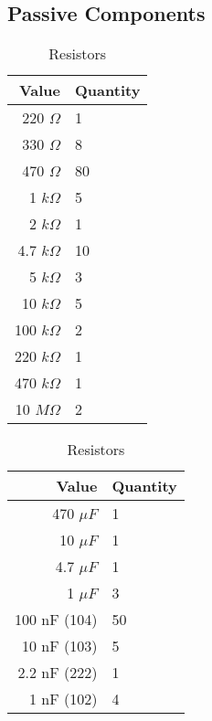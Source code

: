 \subsection{Passive Components}

\begin{table}[H]
  \centering
  \begin{subtable}[t]{0.3\textwidth}
    \vspace{0pt}
    \begin{tabular}{r|l}
      Value                    & Quantity \\ \hline
      220 $\Omega$              & 1  \\
      330 $\Omega$              & 8  \\
      470 $\Omega$              & 80 \\
      1 $k\Omega$               & 5  \\
      2 $k\Omega$               & 1  \\
      4.7 $k\Omega$             & 10 \\
      5 $k\Omega$               & 3  \\
      10 $k\Omega$              & 5  \\
      100 $k\Omega$             & 2  \\
      220 $k\Omega$             & 1  \\
      470 $k\Omega$             & 1  \\
      10 $M\Omega$              & 2  \\
    \end{tabular}
    \caption{Resistors}
  \end{subtable}
  \hfill
  \begin{subtable}[t]{0.3\textwidth}
    \vspace{0pt}
    \begin{tabular}{r|l}
      Value                    & Quantity \\ \hline
      470 $\mu F$              & 1 \\    
      10 $\mu F$               & 1 \\    
      4.7 $\mu F$              & 1 \\    
      1 $\mu F$                & 3 \\    
      100 nF (104)             & 50\\    
      10 nF (103)              & 5 \\    
      2.2 nF (222)             & 1 \\
      1 nF (102)               & 4 \\

\end{tabular}
\end{subtable}
\end{table}
